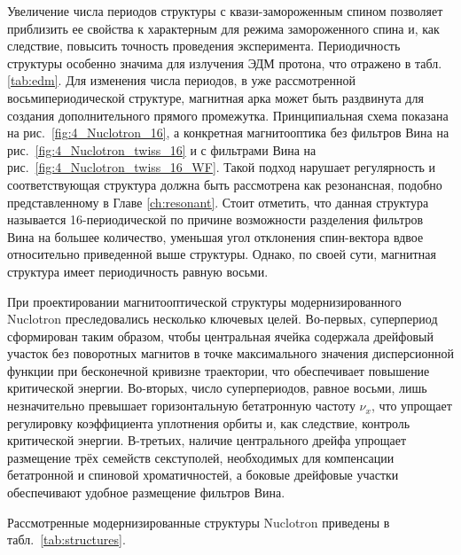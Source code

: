 \par Увеличение числа периодов структуры с квази-замороженным спином позволяет приблизить ее свойства к характерным для режима замороженного спина и, как следствие, повысить точность проведения эксперимента. Периодичность структуры особенно значима для излучения ЭДМ протона, что отражено в табл. \ref{tab:edm}. Для изменения числа периодов, в уже рассмотренной восьмипериодической структуре, магнитная арка может быть раздвинута для создания дополнительного прямого промежутка. Принципиальная схема показана на рис.~\ref{fig:4_Nuclotron_16}, а конкретная магнитооптика без фильтров Вина на рис.~\ref{fig:4_Nuclotron_twiss_16} и с фильтрами Вина на рис.~\ref{fig:4_Nuclotron_twiss_16_WF}. Такой подход нарушает регулярность и соответствующая структура должна быть рассмотрена как резонансная, подобно представленному в Главе \ref{ch:resonant}. Стоит отметить, что данная структура называется 16-периодической по причине возможности разделения фильтров Вина на большее количество, уменьшая угол отклонения спин-вектора вдвое относительно приведенной выше структуры. Однако, по своей сути, магнитная структура имеет периодичность равную восьми.

\par При проектировании магнитооптической структуры модернизированного Nuclotron преследовались несколько ключевых целей. Во-первых, суперпериод сформирован таким образом, чтобы центральная ячейка содержала дрейфовый участок без поворотных магнитов в точке максимального значения дисперсионной функции при бесконечной кривизне траектории, что обеспечивает повышение критической энергии. Во-вторых, число суперпериодов, равное восьми, лишь незначительно превышает горизонтальную бетатронную частоту ${\nu}_x$, что упрощает регулировку коэффициента уплотнения орбиты и, как следствие, контроль критической энергии. В-третьих, наличие центрального дрейфа упрощает размещение трёх семейств секступолей, необходимых для компенсации бетатронной и спиновой хроматичностей, а боковые дрейфовые участки обеспечивают удобное размещение фильтров Вина.

\par Рассмотренные модернизированные структуры Nuclotron приведены в табл.~\ref{tab:structures}.

